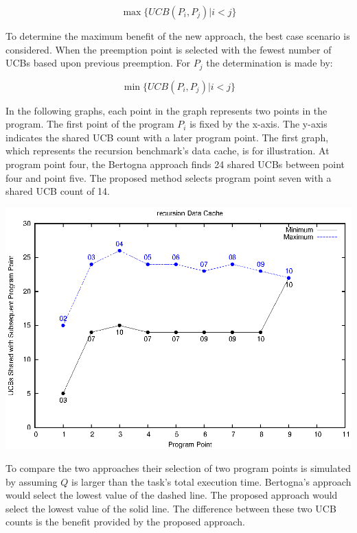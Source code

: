 \begin{equation*}
  \max\{ UCB(P_i, P_j) \vert i < j \}
\end{equation*}

To determine the maximum benefit of the new approach, the best case
scenario is considered. When the preemption point is selected with the
fewest number of UCBs based upon previous preemption.  For ${P_j}$ the
determination is made by:

\begin{equation*}
  \min\{ UCB(P_i, P_j) \vert i < j \}
\end{equation*}


In the following graphs, each point in the graph represents two points
in the program. The first point of the program ${P_i}$ is fixed by the
x-axis. The y-axis indicates the shared UCB count with a later program
point. The first graph, which represents the recursion benchmark's
data cache, is for illustration. At program point four, the Bertogna
approach finds 24 shared UCBs between point four and point five. The
proposed method selects program point seven with a shared UCB count of
14. 

\begin{center}
  \includegraphics[width=\linewidth]{eps/recursion-dcache.eps}
\end{center}

To compare the two approaches their selection of two program points is
simulated by assuming ${Q}$ is larger than the task's total execution
time. Bertogna's approach would select the lowest value of the 
dashed line. The proposed approach would select the lowest value of
the solid line. The difference between these two UCB counts is the
benefit provided by the proposed approach.

